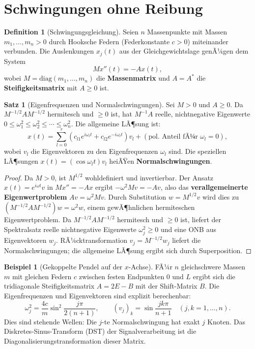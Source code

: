 ﻿\documentclass[a4paper,12pt]{report}
\theoremstyle{definition}
\newtheorem{definition}{Definition}
\newtheorem{beispiel}{Beispiel}
\newtheorem{satz}{Satz}
\begin{document}
\section{Schwingungen ohne Reibung}

\begin{definition}[Schwingungsgleichung]
    Seien $n$ Massenpunkte mit Massen $m_1, \dots, m_n > 0$ durch
    Hooksche Federn (Federkonstante $c > 0$) miteinander verbunden.
    Die Auslenkungen $x_j(t)$ aus der Gleichgewichtslage genÃ¼gen dem
    System
    \[
        M x''(t) = -A x(t),
    \]
    wobei $M = \mathrm{diag}(m_1, \dots, m_n)$ die \textbf{Massenmatrix}
    und $A = A^*$ die \textbf{Steifigkeitsmatrix} mit $A \geq 0$ ist.
\end{definition}

\begin{satz}[Eigenfrequenzen und Normalschwingungen]
    Sei $M > 0$ und $A \geq 0$. Da $M^{-1/2} A M^{-1/2}$ hermitesch
    und $\geq 0$ ist, hat $M^{-1}A$ reelle, nichtnegative Eigenwerte
    $0 \leq \omega_1^2 \leq \omega_2^2 \leq \cdots \leq \omega_n^2$.
    Die allgemeine LÃ¶sung ist:
    \[
        x(t) = \sum_{l=0}^{r} (c_{l1} e^{i\omega_l t} + c_{l2} e^{-i\omega_l t})
        v_l + (\text{pol. Anteil fÃ¼r } \omega_l = 0),
    \]
    wobei $v_l$ die Eigenvektoren zu den Eigenfrequenzen $\omega_l$ sind.
    Die speziellen LÃ¶sungen $x(t) = (\cos \omega_l t) v_l$ heiÃŸen
    \textbf{Normalschwingungen}.
\end{satz}
\begin{proof}
    Da $M > 0$, ist $M^{1/2}$ wohldefiniert und invertierbar. Der Ansatz
    $x(t) = e^{i\omega t} v$ in $Mx'' = -Ax$ ergibt $-\omega^2 M v = -Av$,
    also das \textbf{verallgemeinerte Eigenwertproblem} $Av = \omega^2 M v$.
    Durch Substitution $w = M^{1/2} v$ wird dies zu $(M^{-1/2} A M^{-1/2}) w = \omega^2 w$,
    einem gewÃ¶hnlichen hermiteschen Eigenwertproblem.
    Da $M^{-1/2} A M^{-1/2}$ hermitesch und $\geq 0$ ist, liefert der Spektralsatz
    reelle nichtnegative Eigenwerte $\omega_j^2 \geq 0$ und eine ONB aus
    Eigenvektoren $w_j$. RÃ¼cktransformation $v_j = M^{-1/2} w_j$ liefert
    die Normalschwingungen; die allgemeine LÃ¶sung ergibt sich durch Superposition.
\end{proof}


\begin{beispiel}[Gekoppelte Pendel auf der $x$-Achse]
    FÃ¼r $n$ gleichschwere Massen $m$ mit gleichen Federn $c$ zwischen
    festen Endpunkten $0$ und $L$ ergibt sich die tridiagonale
    Steifigkeitsmatrix $A = 2E - B$ mit der Shift-Matrix $B$.
    Die Eigenfrequenzen und Eigenvektoren sind explizit berechenbar:
    \[
        \omega_j^2 = \frac{4c}{m} \sin^2\!\frac{j\pi}{2(n+1)},
        \qquad
        (v_j)_k = \sin\frac{jk\pi}{n+1} \quad (j, k = 1, \dots, n).
    \]
    Dies sind stehende Wellen: Die $j$-te Normalschwingung hat exakt
    $j$ Knoten. Das Diskretes-Sinus-Transform (DST) der Signalverarbeitung
    ist die Diagonalisierungstransformation dieser Matrix.
\end{beispiel}
\end{document}
